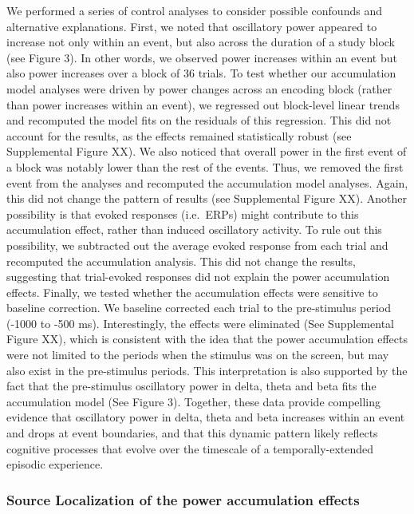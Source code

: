We performed a series of control analyses to consider possible confounds
and alternative explanations. First, we noted that oscillatory power
appeared to increase not only within an event, but also across the
duration of a study block (see Figure 3). In other words, we observed
power increases within an event but also power increases over a block of
36 trials. To test whether our accumulation model analyses were driven
by power changes across an encoding block (rather than power increases
within an event), we regressed out block-level linear trends and
recomputed the model fits on the residuals of this regression. This did
not account for the results, as the effects remained statistically
robust (see Supplemental Figure XX). We also noticed that overall power
in the first event of a block was notably lower than the rest of the
events. Thus, we removed the first event from the analyses and
recomputed the accumulation model analyses. Again, this did not change
the pattern of results (see Supplemental Figure XX). Another possibility
is that evoked responses (i.e.~ERPs) might contribute to this
accumulation effect, rather than induced oscillatory activity. To rule
out this possibility, we subtracted out the average evoked response from
each trial and recomputed the accumulation analysis. This did not change
the results, suggesting that trial-evoked responses did not explain the
power accumulation effects. Finally, we tested whether the accumulation
effects were sensitive to baseline correction. We baseline corrected
each trial to the pre-stimulus period (-1000 to -500 ms). Interestingly,
the effects were eliminated (See Supplemental Figure XX), which is
consistent with the idea that the power accumulation effects were not
limited to the periods when the stimulus was on the screen, but may also
exist in the pre-stimulus periods. This interpretation is also supported
by the fact that the pre-stimulus oscillatory power in delta, theta and
beta fits the accumulation model (See Figure 3). Together, these data
provide compelling evidence that oscillatory power in delta, theta and
beta increases within an event and drops at event boundaries, and that
this dynamic pattern likely reflects cognitive processes that evolve
over the timescale of a temporally-extended episodic experience.

\subsubsection{Source Localization of the power accumulation
effects}\label{source-localization-of-the-power-accumulation-effects}

